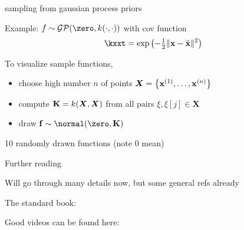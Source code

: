 \documentclass[11pt,compress,t,notes=noshow, xcolor=table]{beamer}
\begin{document}
\begin{framei}[sep=L]{sampling from gaussian process priors}
\item Example: $f \sim \GPzk$ with cov function
$$ \kxxt = \exp\left(-\tfrac{1}{2}\xxtnorm^2\right)$$
\item To visualize sample functions, 
\begin{itemize}
\item choose high number $n$ of points $\bm{X} = \left\{ \mathbf{x}^{(1)}, \ldots, \mathbf{x}^{(n)}\right\}$
  \item compute $\mathbf{K} = k(\bm{X}, \bm{X})$ from all pairs $\xi, \xi[j] \in \bm{X}$ 
  \item draw $\fv \sim \Nzk$ 
\end{itemize}
\item 10 randomly drawn functions (note 0 mean)
\vfill
{}
\end{framei}

\begin{framei}[sep=L]{Further reading}

\item Will go through many details now, but some general refs already

\item The standard book: 

\item Good videos can be found here:



\end{framei}
\endlecture
\end{document}
